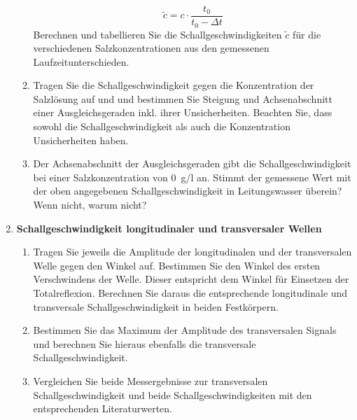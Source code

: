 \begin{enumerate}
\begin{enumerate}
		\begin{equation}
			\tilde{c} = c\cdot\frac{t_0}{t_0-\Delta t}
		\end{equation}
		Berechnen und tabellieren Sie die Schallgeschwindigkeiten $\tilde{c}$ für die verschiedenen Salzkonzentrationen aus den gemessenen Laufzeitunterschieden. 
		\item Tragen Sie die Schallgeschwindigkeit gegen die Konzentration der Salzlösung auf und und bestimmen Sie Steigung und Achsenabschnitt einer Ausgleichsgeraden inkl. ihrer Unsicherheiten. Beachten Sie, dass sowohl die Schallgeschwindigkeit als auch die Konzentration Unsicherheiten haben.
		\item Der Achsenabschnitt der Ausgleichsgeraden gibt die Schallgeschwindigkeit bei einer Salzkonzentration von 0~g/l an. Stimmt der gemessene Wert mit der oben angegebenen Schallgeschwindigkeit in Leitungswasser überein? \\
		Wenn nicht, warum nicht?
	\end{enumerate}
	\item \textbf{Schallgeschwindigkeit longitudinaler und transversaler Wellen}
	\begin{enumerate}
		\item Tragen Sie jeweils die Amplitude der longitudinalen und der transversalen Welle gegen den Winkel auf. Bestimmen Sie den Winkel des ersten Verschwindens der Welle. Dieser entspricht dem Winkel für Einsetzen der Totalreflexion. Berechnen Sie daraus die entsprechende longitudinale und transversale Schallgeschwindigkeit in beiden Festkörpern.
		\item Bestimmen Sie das Maximum der Amplitude des transversalen Signals und berechnen Sie hieraus ebenfalls die transversale Schallgeschwindigkeit.
		\item Vergleichen Sie beide Messergebnisse zur transversalen Schallgeschwindigkeit und beide Schallgeschwindigkeiten mit den entsprechenden Literaturwerten.
	\end{enumerate}
\end{enumerate}